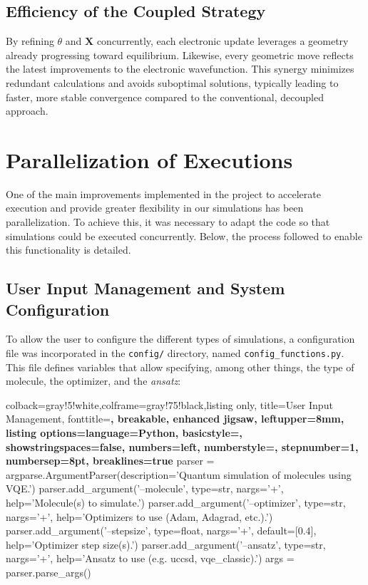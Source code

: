\subsection{Efficiency of the Coupled Strategy}
By refining \(\theta\) and \(\mathbf{X}\) concurrently, each electronic update leverages a geometry already progressing toward equilibrium. Likewise, every geometric move reflects the latest improvements to the electronic wavefunction. This synergy minimizes redundant calculations and avoids suboptimal solutions, typically leading to faster, more stable convergence compared to the conventional, decoupled approach.

\section{Parallelization of Executions}
One of the main improvements implemented in the project to accelerate execution and provide greater flexibility in our simulations has been parallelization. To achieve this, it was necessary to adapt the code so that simulations could be executed concurrently. Below, the process followed to enable this functionality is detailed.

\subsection{User Input Management and System Configuration}
To allow the user to configure the different types of simulations, a configuration file was incorporated in the \texttt{config/} directory, named \texttt{config\_functions.py}. This file defines variables that allow specifying, among other things, the type of molecule, the optimizer, and the \emph{ansatz}:

\begin{tcblisting}{colback=gray!5!white,colframe=gray!75!black,listing only,
    title=User Input Management, fonttitle=\bfseries, breakable, enhanced jigsaw, leftupper=8mm,
    listing options={language=Python, basicstyle=\ttfamily\small,
    showstringspaces=false, numbers=left, numberstyle=\footnotesize,
    stepnumber=1, numbersep=8pt, breaklines=true}}
parser = argparse.ArgumentParser(description='Quantum simulation of molecules using VQE.')
parser.add_argument('--molecule', type=str, nargs='+', help='Molecule(s) to simulate.')
parser.add_argument('--optimizer', type=str, nargs='+', help='Optimizers to use (Adam, Adagrad, etc.).')
parser.add_argument('--stepsize', type=float, nargs='+', default=[0.4], help='Optimizer step size(s).')
parser.add_argument('--ansatz', type=str, nargs='+', help='Ansatz to use (e.g. uccsd, vqe_classic).')
args = parser.parse_args()
\end{tcblisting}

